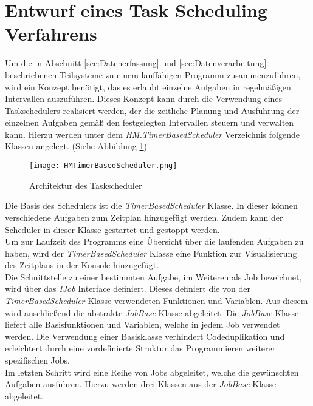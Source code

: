 \section{Entwurf eines Task Scheduling Verfahrens}\label{sec:Gesamtkonzept}
Um die in Abschnitt \ref{sec:Datenerfassung} und \ref{sec:Datenverarbeitung} beschriebenen Teilsysteme zu einem lauffähigen Programm zusammenzuführen, wird ein Konzept benötigt, das es erlaubt einzelne Aufgaben in regelmäßigen Intervallen auszuführen. Dieses Konzept kann durch die Verwendung eines Taskschedulers realisiert werden, der die zeitliche Planung und Ausführung der einzelnen Aufgaben gemäß den festgelegten Intervallen steuern und verwalten kann. Hierzu werden unter dem \textit{HM.TimerBasedScheduler} Verzeichnis folgende Klassen angelegt. (Siehe Abbildung \ref{fig:TimerBasedScheduler})
\begin{center}
    \begin{figure}[h!]
        \captionsetup{justification=centering,format=plain, font=small}
        \centering
        \texttt{[image: HMTimerBasedScheduler.png]}
        \caption{Architektur des Taskscheduler}
        \label{fig:TimerBasedScheduler}
    \end{figure}
\end{center}
Die Basis des Schedulers ist die \textit{TimerBasedScheduler} Klasse. In dieser können verschiedene Aufgaben zum Zeitplan hinzugefügt werden. Zudem kann der Scheduler in dieser Klasse gestartet und gestoppt werden.\\
Um zur Laufzeit des Programms eine Übersicht über die laufenden Aufgaben zu haben, wird der \textit{TimerBasedScheduler} Klasse eine Funktion zur Visualisierung des Zeitplans in der Konsole hinzugefügt.\\
Die Schnittstelle zu einer bestimmten Aufgabe, im Weiteren als Job bezeichnet, wird über das \textit{IJob} Interface definiert. Dieses definiert die von der \textit{TimerBasedScheduler} Klasse verwendeten Funktionen und Variablen. Aus diesem wird anschließend die abstrakte \textit{JobBase} Klasse abgeleitet. Die \textit{JobBase} Klasse liefert alle Basisfunktionen und Variablen, welche in jedem Job verwendet werden. Die Verwendung einer Basisklasse verhindert Codeduplikation und erleichtert durch eine vordefinierte Struktur das Programmieren weiterer spezifischen Jobs.\\
Im letzten Schritt wird eine Reihe von Jobs abgeleitet, welche die gewünschten Aufgaben ausführen. Hierzu werden drei Klassen aus der \textit{JobBase} Klasse abgeleitet.
